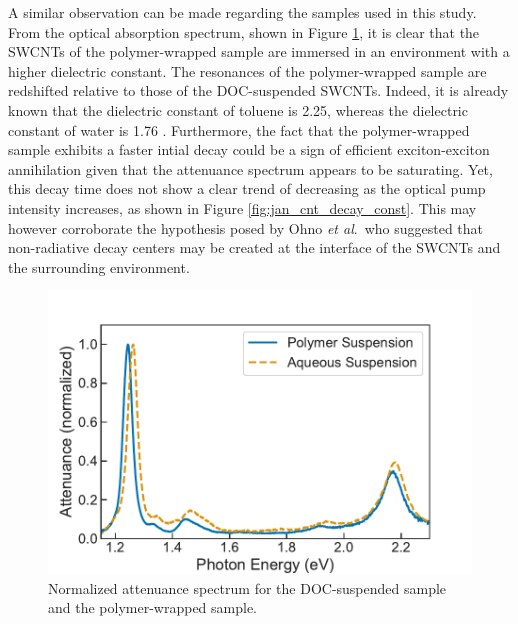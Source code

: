 A similar observation can be made regarding the samples used in this study. From the optical absorption spectrum, shown in Figure \ref{fig:abs_comp_normalized}, it is clear that the SWCNTs of the polymer-wrapped sample are immersed in an environment with a higher dielectric constant. The resonances of the polymer-wrapped sample are redshifted relative to those of the DOC-suspended SWCNTs. Indeed, it is already known that the dielectric constant of toluene is 2.25, whereas the dielectric constant of water is 1.76 \cite{samoc2003dispersion}. Furthermore, the fact that the polymer-wrapped sample exhibits a faster intial decay could be a sign of efficient exciton-exciton annihilation given that the attenuance spectrum appears to be saturating. Yet, this decay time does not show a clear trend of decreasing as the optical pump intensity increases, as shown in Figure \ref{fig:jan_cnt_decay_const}. This may however corroborate the hypothesis posed by Ohno \textit{et al}.\ who suggested that non-radiative decay centers may be created at the interface of the SWCNTs and the surrounding environment.

\begin{figure}[H]
	\centering
	\includegraphics[scale=0.8]{images/chapter_my_data/abs_normalized}
	\caption{Normalized attenuance spectrum for the DOC-suspended sample and the polymer-wrapped sample.}
	\label{fig:abs_comp_normalized}
\end{figure}

